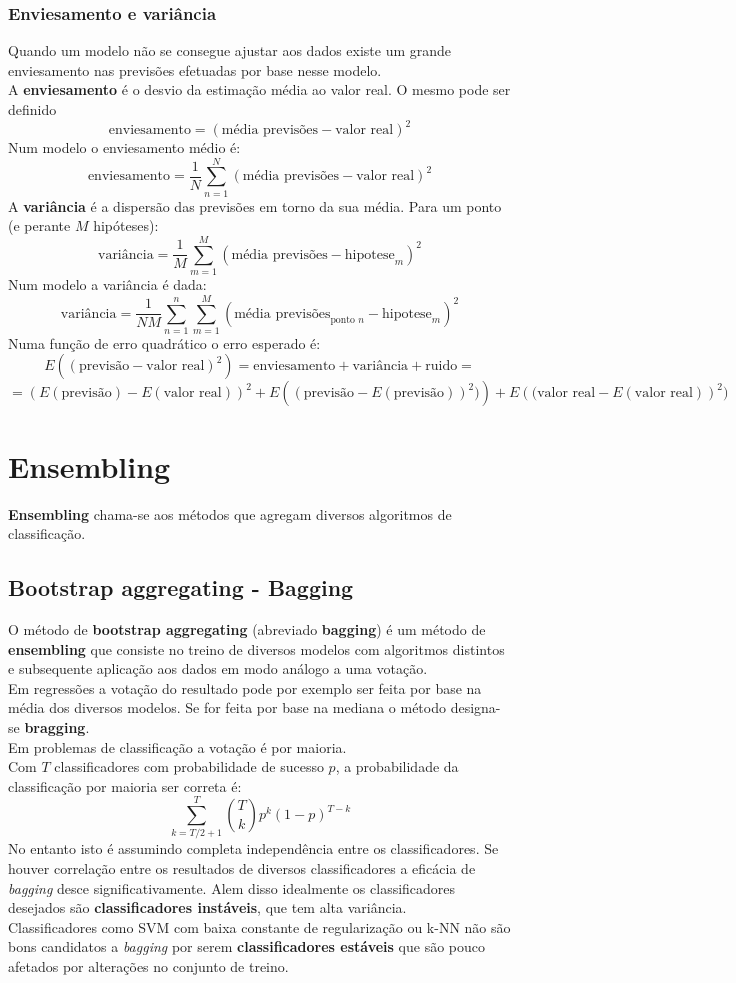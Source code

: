 \documentclass[]{report}
\begin{document}
\subsection{Enviesamento e variância}
Quando um modelo não se consegue ajustar aos dados existe um grande enviesamento nas previsões efetuadas por base nesse modelo.\\
A \textbf{enviesamento} é o desvio da estimação média ao valor real. O mesmo pode ser definido
$$\text{enviesamento} = (\text{média previsões} - \text{valor real})^2$$
Num modelo o enviesamento médio é:
$$\text{enviesamento} = \frac{1}{N}\sum_{n=1}^N(\text{média previsões} - \text{valor real})^2$$
A \textbf{variância} é a dispersão das previsões em torno da sua média. Para um ponto (e perante $M$ hipóteses):
$$\text{variância} = \frac{1}{M}\sum_{m=1}^M (\text{média previsões} - \text{hipotese}_m)^2$$
Num modelo a variância é dada:
$$\text{variância} = \frac{1}{NM}\sum_{n=1}^n \sum_{m=1}^M (\text{média previsões}_{\text{ponto }n} - \text{hipotese}_m)^2$$
Numa função de erro quadrático o erro esperado é:
$$E((\text{previsão} - \text{valor real})^2) =\text{enviesamento} + \text{variância} + \text{ruido} =$$
$$= \left(E(\text{previsão}) - E(\text{valor real})\right)^2 +
E\left((\text{previsão}-E(\text{previsão}))^2)\right) +
E\left((\text{valor real}-E(\text{valor real})\right)^2)$$
\chapter{Ensembling}
\textbf{Ensembling} chama-se aos métodos que agregam diversos algoritmos de classificação.
\section{Bootstrap aggregating - Bagging}
O método de \textbf{bootstrap aggregating} (abreviado \textbf{bagging}) é um método de \textbf{ensembling} que consiste no treino de diversos modelos com algoritmos distintos e subsequente aplicação aos dados em modo análogo a uma votação.\\[2mm]
Em regressões a votação do resultado pode por exemplo ser feita por base na média dos diversos modelos. Se for feita por base na mediana o método designa-se \textbf{bragging}.\\[2mm]
Em problemas de classificação a votação é por maioria.\\
Com $T$ classificadores com probabilidade de sucesso $p$, a probabilidade da classificação por maioria ser correta é:
$$\sum_{k=T/2+1}^{T}\binom{T}{k} p^k (1-p)^{T-k}$$
No entanto isto é assumindo completa independência entre os classificadores. Se houver correlação entre os resultados de diversos classificadores a eficácia de \textit{bagging} desce significativamente. Alem disso idealmente os classificadores desejados são \textbf{classificadores instáveis}, que tem alta variância.\\
Classificadores como SVM com baixa constante de regularização ou k-NN não são bons candidatos a \textit{bagging} por serem \textbf{classificadores estáveis} que são pouco afetados por alterações no conjunto de treino.
\end{document}
